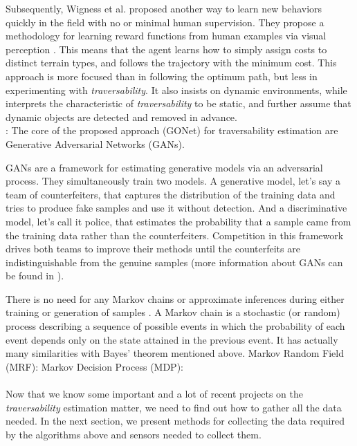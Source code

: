 \documentclass[12pt,a4paper]{report}
\newcommand{\etal}[1]{#1 et al.}
\newcommand{\term}{\textit}
\newcommand{\acronym}{\MakeUppercase}
\begin{document}
	Subsequently, \etal{Wigness} proposed another way to learn new behaviors quickly 
	in the field with no or minimal human supervision. They propose a methodology 
	for learning reward functions from human examples via visual perception 
	\cite{Wigness}. This means that the agent learns how to simply assign costs to 
	distinct terrain types, and follows the trajectory with the minimum cost. This 
	approach is more focused than \cite{Suger} in following the optimum path, but 
	less in experimenting with \term{traversability}. It also insists on dynamic 
	environments, while \cite{Suger} interprets the characteristic of 
	\term{traversability} to be static, and further assume that dynamic objects are 
	detected and removed in advance.
	\\
	
	
	
	\cite{HiroseGonet}: The core of the proposed approach (GONet) for traversability estimation are Generative Adversarial Networks (GANs).
	\par
	\acronym{gan}s are a framework for estimating generative models via an 
	adversarial process. They simultaneously train two models. A generative model, 
	let's say a team of counterfeiters, that captures the distribution of the 
	training data and tries to produce fake samples and use it without detection. 
	And a discriminative model, let's call it police, that estimates the probability 
	that a sample came from the training data rather than the counterfeiters. 
	Competition in this framework drives both teams to improve their methods until 
	the counterfeits are indistinguishable from the genuine samples (more information 
	about \acronym{gan}s can be found in \cite{Goodfellow}).
	\par
	There is no need for any Markov chains or approximate inferences during either 
	training or generation of samples \cite{Goodfellow}. A Markov chain is a 
	stochastic (or random) process describing a sequence of possible events in which 
	the probability of each event depends only on the state attained in the previous 
	event. It has actually many similarities with Bayes' theorem mentioned above.
	Markov Random Field (\acronym{mrf}): \cite{Pfaff, Lalonde}
	Markov Decision Process (\acronym{mdp}): \cite{Wigness, Zhelo}
	\\\\
	
	
	Now that we know some important and a lot of recent projects on the 
	\term{traversability} estimation matter, we need to find out how to gather all 
	the data needed. In the next section, we present methods for collecting the data 
	required by the algorithms above and sensors needed to collect them.
	\\
	
\end{document}
